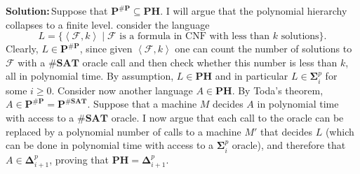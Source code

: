 \documentclass{amsart}
\theoremstyle{plain}
\theoremstyle{definition}
\newcommand{\p}{\textbf{P}}
\newcommand{\ph}{\textbf{PH}}
\newcommand{\sharpp}{\textbf{\#P}}
\newcommand{\sharpsat}{\textbf{\#SAT}}
\newcommand{\sol}{\textbf{Solution:\,}}
\begin{document}
\begin{enumerate}[label=\textbf{Exercise \arabic*:}, leftmargin=0cm, labelwidth=-0.2cm, align=left]
        \sol Suppose that $\p^{\sharpp} \subseteq \ph$.
        I will argue that the polynomial hierarchy collapses to a finite level.
        consider the language
        \[
            L = \{ \left< \mathcal{F}, k \right> \mid \mathcal{F} \text{ is a formula in CNF with less than } k \text{ solutions}\}.
        \]
        Clearly, $L \in \p^{\sharpp}$, since given $\left< \mathcal{F}, k \right>$ one
        can count the number of solutions to $\mathcal{F}$ with a $\sharpsat$ oracle
        call and then check whether this number is less than $k$, all in polynomial time.
        By assumption, $L \in \ph$ and in particular $L \in \mathbf{\Sigma}^p_i$ for some $i \geq 0$.
        Consider now another language $A \in \ph$.
        By Toda's theorem, $A \in \p^{\sharpp} = \p^{\sharpsat}$.
        Suppose that a machine $M$ decides $A$ in polynomial time with access to a $\sharpsat$ oracle.
        I now argue that each call to the oracle can be replaced by a polynomial number of calls to a
        machine $M'$ that decides $L$ (which can be done in polynomial time with access to a $\mathbf{\Sigma}^p_i$ oracle),
        and therefore that $A \in \mathbf{\Delta}^p_{i+1}$, proving that $\ph = \mathbf{\Delta}^p_{i+1}$.
        

    \end{enumerate}
\end{document}
